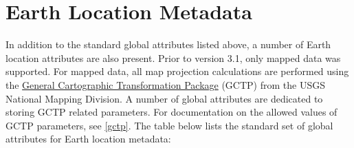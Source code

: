 \section{Earth Location Metadata}

In addition to the standard global attributes listed above, a number
of Earth location attributes are also present. Prior to version 3.1,
only mapped data was supported. For mapped data, all map projection
calculations are performed using the
\href{http://edcwww.cr.usgs.gov/pub/software/gctpc}{General
Cartographic Transformation Package} (GCTP) from the USGS National
Mapping Division. A number of global attributes are dedicated to
storing GCTP related parameters. For documentation on the allowed
values of GCTP parameters, see \autoref{gctp}.  The table below lists
the standard set of global attributes for Earth location metadata:

